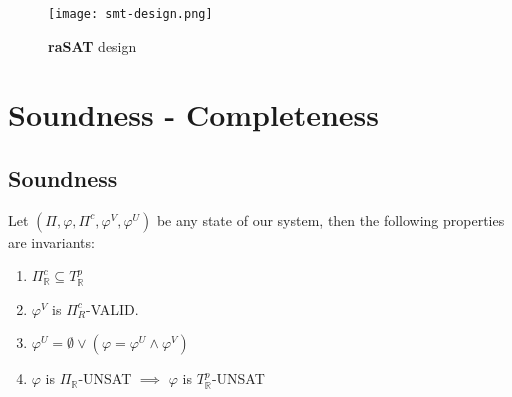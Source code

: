\begin{figure}[ht]
\centering
\texttt{[image: smt-design.png]} 
\caption{\textbf{raSAT} design} 
\label{fig:smt-design} 
\end{figure}

\section{Soundness - Completeness}
\subsection{Soundness}
\begin{theorem}
Let $(\Pi, \varphi, \Pi^c, \varphi^V, \varphi^U)$ be any state of our system, then the following properties are invariants:
\begin{enumerate}
\item $\Pi^c_\mathbb{R} \subseteq T^p_\mathbb{R}$
\item $\varphi^V$ is $\Pi^c_{R}$-VALID.
\item $\varphi^U = \emptyset \vee (\varphi = \varphi^U \wedge \varphi^V)$
\item $\varphi$ is $\Pi_\mathbb{R}$-UNSAT $\implies$ $\varphi$ is $T^p_\mathbb{R}$-UNSAT
\end{enumerate}
\end{theorem}

